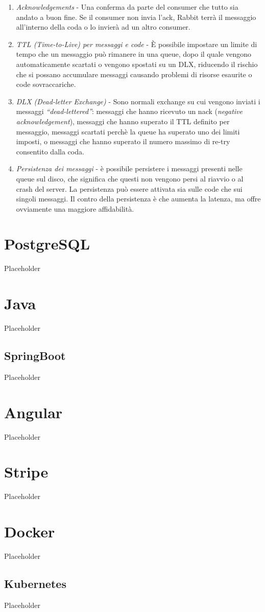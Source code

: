 \begin{itemize}
{      \begin{enumerate}
        \item
          \textit{Acknowledgements} -  Una conferma da parte del consumer che tutto sia andato a buon fine.
          Se il consumer non invia l'ack, Rabbit terr\`a il messaggio all'interno della coda o lo invier\`a ad un altro consumer.
        \item \textit{TTL (Time-to-Live) per messaggi e code} - \`E possibile impostare un limite di tempo che un messaggio pu\`o rimanere
          in una queue, dopo il quale vengono automaticamente scartati o vengono spostati su un DLX, riducendo il rischio che si
          possano accumulare messaggi causando problemi di risorse esaurite o code sovraccariche.
        \item \textit{DLX (Dead-letter Exchange)} - Sono normali exchange su cui vengono inviati i messaggi \textit{``dead-lettered''}: messaggi che hanno
          ricevuto un nack (\textit{negative acknowledgement}), messaggi che hanno superato il TTL definito per messaggio, messaggi
          scartati perch\`e la queue ha superato uno dei limiti imposti, o messaggi che hanno superato il numero massimo di re-try consentito dalla coda.
        \item \textit{Persistenza dei messaggi} -  \`e possibile persistere i messaggi presenti nelle queue sul disco,
          che significa che questi non vengono persi al riavvio o al crash del server. La persistenza pu\`o essere attivata sia sulle code che sui singoli messaggi.
          Il contro della persistenza \`e che aumenta la latenza, ma offre ovviamente una maggiore affidabilit\`a.
      \end{enumerate}
    }
\end{itemize}

\section{PostgreSQL}
Placeholder
\section{Java}
Placeholder
\subsection {SpringBoot}
Placeholder
\section{Angular}
Placeholder
\section{Stripe}
Placeholder
\section{Docker}
Placeholder
\subsection{Kubernetes}
Placeholder
